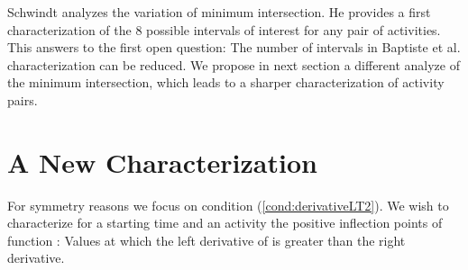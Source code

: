 \documentclass{llncs}
\begin{document}
Schwindt analyzes the variation of minimum intersection. He provides a first characterization of the 8 possible intervals of interest for any pair of activities. 
This answers to the first open question: The number of intervals in Baptiste et al. characterization can be reduced.
We propose in next section a different analyze of the minimum intersection, which leads to a sharper characterization of activity pairs.

\section{A New Characterization}


For symmetry reasons we focus on condition (\ref{cond:derivativeLT2}).
We wish to characterize for a starting time  and an activity  the positive inflection points of function :
Values  at which the left derivative of is greater than the right derivative.
\end{document}
